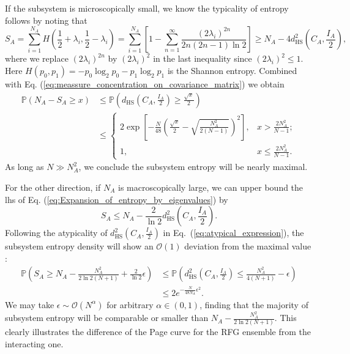 \documentclass[aps,onecolumn,nofootinbib,superscriptaddress,notitlepage,longbibliography]{revtex4-1}
\begin{document}
If the subsystem is microscopically small, we know the typicality of entropy
follows by noting that 
\begin{equation}
S_A=\sum_{i=1}^{N_{A}}H\left(\frac{1}{2}+\lambda_{i},\frac{1}{2}-\lambda_{i}\right)=\sum_{i=1}^{N_{A}}\left[1-\sum_{n=1}^{\infty}\frac{(2\lambda_{i})^{2n}}{2n(2n-1)\ln2}\right]\geq N_{A}-4d_{\mathrm{HS}}^{2}\left(C_{A},\frac{I_{A}}{2}\right),
\label{eq:Expansion_of_entropy_by_eigenvalues}
\end{equation}
where we replace $(2\lambda_i)^{2n}$ by $(2\lambda_i)^2$ in the last inequality since $(2\lambda_{i})^{2}\leq1$. Here $H(p_0,p_1)=-p_0\log_2 p_0 - p_1\log_2 p_1$ is the Shannon entropy. Combined with Eq. (\ref{eq:meassure_concentration_on_covariance_matrix})
we obtain
\begin{equation}
\begin{split}\mathbb{P}(N_{A}-S_A\geq x) & \leq\mathbb{P}\left(d_{\mathrm{HS}}\left(C_{A},\frac{I_{A}}{2}\right)\geq\frac{\sqrt{x}}{2}\right)\\
 & \leq\begin{cases}
2\exp\left[-\frac{N}{48}\left(\frac{\sqrt{x}}{2}-\sqrt{\frac{N_{A}^{2}}{2(N-1)}}\right)^{2}\right], & x>\frac{2N_{A}^{2}}{N-1};\\
1, & x\leq\frac{2N_{A}^{2}}{N-1}.
\end{cases}
\label{eq:typicality_for_subsystem_entropy}
\end{split}
\end{equation}
As long as $N\gg N_{A}^{2}$, we conclude the subsystem entropy will
be nearly maximal. 

For the other direction, if $N_{A}$ is macroscopically large, we can upper %
bound the lhs of Eq. (\ref{eq:Expansion_of_entropy_by_eigenvalues}) by
\begin{equation}
S_A\leq N_{A}-\frac{2}{\ln2}d_{\mathrm{HS}}^{2}\left(C_{A},\frac{I_{A}}{2}\right).
\end{equation}
Following the atypicality of $d_{\mathrm{HS}}^{2}(C_{A},\frac{I_{A}}{2})$
in Eq.~(\ref{eq:atypical_expression}), the subsystem entropy density
will show an $\mathcal{O}(1)$ deviation from the maximal value%
:
\begin{equation}
\begin{split}\mathbb{P}\left(S_A\geq N_{A}-\frac{N_{A}^{2}}{2\ln2(N+1)}+\frac{2}{\ln2}\epsilon\right) & \leq\mathbb{P}\left(d_{\mathrm{HS}}^{2}\left(C_{A},\frac{I_{A}}{2}\right)\leq\frac{N_{A}^{2}}{4(N+1)}-\epsilon\right)\\
 & \leq2e^{-\frac{N}{48N_{A}}\epsilon^{2}}.
\end{split}
\end{equation}
We may take $\epsilon\sim\mathcal{O}(N^{\alpha})$ for arbitrary $\alpha\in(0,1)$,
finding that the majority of subsystem entropy will be comparable
or smaller than $N_{A}-\frac{N_{A}^{2}}{2\ln2(N+1)}$. This clearly
illustrates the difference of the Page curve for the RFG ensemble from
the interacting one.
\end{document}
